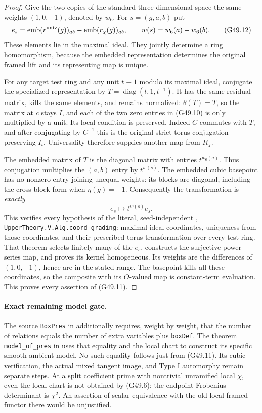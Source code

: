 \begin{proof}
Give the two copies of the standard three-dimensional
space the same weights $(1,0,-1)$, denoted by $w_6$.
For $s=(g,a,b)$ put
\[
 e_s=\operatorname{emb}(r^{\rm univ}(g))_{ab}
       -\operatorname{emb}(r_\chi(g))_{ab},\qquad
                    w(s)=w_6(a)-w_6(b).                     \tag{G49.12}
\]
These elements lie in the maximal ideal.  They jointly
determine a ring homomorphism, because the embedded
representation determines the original framed lift and
its representing map is unique.

For any target test ring and any unit $t\equiv1$ modulo
its maximal ideal, conjugate the specialized representation
by $T=\operatorname{diag}(t,1,t^{-1})$.
It has the same residual matrix, kills the same elements,
and remains normalized: $\theta(T)=T$, so the matrix at
$c$ stays $I$, and each of the two zero entries in
(G49.10) is only multiplied by a unit.
Its local condition is preserved.  Indeed $C$ commutes
with $T$, and after conjugating by $C^{-1}$ this is the
original strict torus conjugation preserving $I_t$.
Universality therefore supplies another map from $R_\chi$.

The embedded matrix of $T$ is the diagonal matrix with
entries $t^{w_6(a)}$.  Thus conjugation multiplies the
$(a,b)$ entry by $t^{w(s)}$.  The embedded cubic basepoint
has no nonzero entry joining unequal weights: its blocks
are diagonal, including the cross-block form when
$\eta(g)=-1$.  Consequently the transformation is
\emph{exactly}
\[
                           e_s\longmapsto t^{w(s)}e_s.        \tag{G49.13}
\]
This verifies every hypothesis of the literal, seed-independent
,
\texttt{UpperTheory.V.Alg.coord\_grading}:
maximal-ideal coordinates, uniqueness from those coordinates,
and their prescribed torus transformation over every test
ring.  That theorem selects finitely many of the $e_s$,
constructs the surjective power-series map, and proves its
kernel homogeneous.  Its weights are the differences of
$(1,0,-1)$, hence are in the stated range.
The basepoint kills all these coordinates, so the composite
with its $O$-valued map is constant-term evaluation.
This proves every assertion of (G49.11).
\end{proof}

\paragraph{Exact remaining model gate.}
The source \texttt{BoxPres} in
 additionally requires,
weight by weight, that the number of relations equals the
number of extra variables plus \texttt{boxDef}.
The theorem \texttt{model\_of\_pres} in
 uses that equality
and the local chart to construct its specific smooth
ambient model.  No such equality follows just from
(G49.11).  Its cubic verification, the actual mixed tangent
image, and Type I automorphy remain separate steps.
At a split coefficient prime with nontrivial unramified
local $\chi$, even the local chart is not obtained by
(G49.6): the endpoint Frobenius determinant is $\chi^2$.
An assertion of scalar equivalence with the old local
framed functor there would be unjustified.

